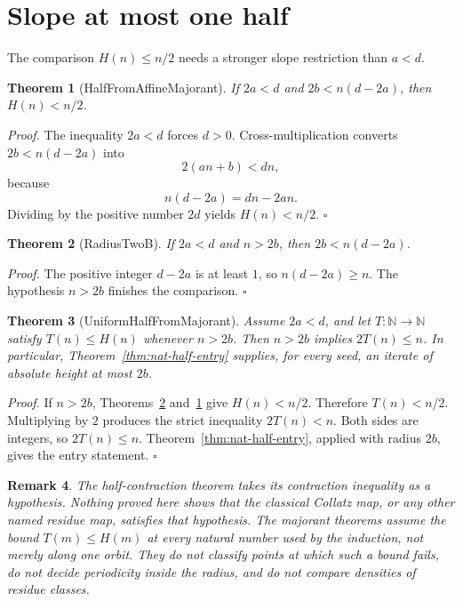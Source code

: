 \documentclass[11pt,letterpaper]{article}
\newcommand{\N}{\mathbb{N}}
\newcommand{\Map}[3]{#1 \colon #2 \to #3}
\newtheorem{theorem}{Theorem}
\newtheorem{remark}[theorem]{Remark}
\newenvironment{proof}{\noindent\textit{Proof.}}{\hfill\(\square\)}
\begin{document}
\section{Slope at most one half}

The comparison \(H(n)\le n/2\) needs a stronger slope restriction than \(a<d\).

\begin{theorem}[HalfFromAffineMajorant]
\label{thm:half-from-majorant}
If \(2a<d\) and \(2b<n(d-2a)\), then \(H(n)<n/2\).
\end{theorem}

\begin{proof}
The inequality \(2a<d\) forces \(d>0\). Cross-multiplication converts \(2b<n(d-2a)\) into
\[
2(an+b)<dn,
\]
because
\[
n(d-2a)=dn-2an.
\]
Dividing by the positive number \(2d\) yields \(H(n)<n/2\).
\end{proof}

\begin{theorem}[RadiusTwoB]
\label{thm:radius-two-b}
If \(2a<d\) and \(n>2b\), then \(2b<n(d-2a)\).
\end{theorem}

\begin{proof}
The positive integer \(d-2a\) is at least \(1\), so \(n(d-2a)\ge n\). The hypothesis \(n>2b\) finishes the comparison.
\end{proof}

\begin{theorem}[UniformHalfFromMajorant]
\label{thm:uniform-half-from-majorant}
Assume \(2a<d\), and let \(\Map{T}{\N}{\N}\) satisfy \(T(n)\le H(n)\) whenever \(n>2b\). Then \(n>2b\) implies \(2T(n)\le n\). In particular, Theorem~\ref{thm:nat-half-entry} supplies, for every seed, an iterate of absolute height at most \(2b\).
\end{theorem}

\begin{proof}
If \(n>2b\), Theorems~\ref{thm:radius-two-b} and~\ref{thm:half-from-majorant} give \(H(n)<n/2\). Therefore \(T(n)<n/2\). Multiplying by \(2\) produces the strict inequality \(2T(n)<n\). Both sides are integers, so \(2T(n)\le n\). Theorem~\ref{thm:nat-half-entry}, applied with radius \(2b\), gives the entry statement.
\end{proof}

\begin{remark}
\label{rem:not-claimed}
The half-contraction theorem takes its contraction inequality as a hypothesis. Nothing proved here shows that the classical Collatz map, or any other named residue map, satisfies that hypothesis. The majorant theorems assume the bound \(T(m)\le H(m)\) at every natural number used by the induction, not merely along one orbit. They do not classify points at which such a bound fails, do not decide periodicity inside the radius, and do not compare densities of residue classes.
\end{remark}
\end{document}
